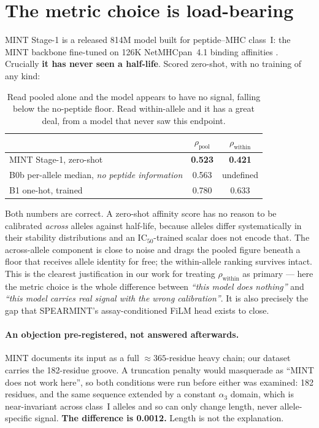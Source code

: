 \documentclass[11pt,a4paper]{article}
\newcommand{\rhop}{\rho_{\text{pool}}}
\newcommand{\rhow}{\rho_{\text{within}}}
\begin{document}
\section{The metric choice is load-bearing}
\label{sec:metric}

MINT Stage-1 \citep{ullanat2026mint, karthikeyan2026spearmint} is a released 814M model built for
peptide--MHC class~I: the MINT backbone fine-tuned on 126K NetMHCpan~4.1 binding affinities
\citep{reynisson2020netmhcpan}. Crucially \textbf{it has never seen a half-life}. Scored zero-shot,
with no training of any kind:

\begin{table}[H]
\centering\small
\begin{tabular}{@{}lcc@{}}
\toprule
 & $\rhop$ & $\rhow$ \\
\midrule
MINT Stage-1, zero-shot & \textbf{0.523} & \textbf{0.421} \\
B0b per-allele median, \emph{no peptide information} & 0.563 & undefined \\
B1 one-hot, trained & 0.780 & 0.633 \\
\bottomrule
\end{tabular}
\caption{Read pooled alone and the model appears to have no signal, falling below the no-peptide
floor. Read within-allele and it has a great deal, from a model that never saw this endpoint.}
\end{table}

Both numbers are correct. A zero-shot affinity score has no reason to be calibrated \emph{across}
alleles against half-life, because alleles differ systematically in their stability distributions
and an $\text{IC}_{50}$-trained scalar does not encode that. The across-allele component is close
to noise and drags the pooled figure beneath a floor that receives allele identity for free; the
within-allele ranking survives intact. This is the clearest justification in our work for treating
$\rhow$ as primary --- here the metric choice is the whole difference between \emph{``this model
does nothing''} and \emph{``this model carries real signal with the wrong calibration''}. It is
also precisely the gap that SPEARMINT's assay-conditioned FiLM head \citep{perez2018film} exists to
close.

\paragraph{An objection pre-registered, not answered afterwards.} MINT documents its input as a
full $\approx365$-residue heavy chain; our dataset carries the 182-residue groove. A truncation
penalty would masquerade as ``MINT does not work here'', so both conditions were run before either
was examined: 182 residues, and the same sequence extended by a constant $\alpha_3$ domain, which
is near-invariant across class~I alleles and so can only change length, never allele-specific
signal. \textbf{The difference is 0.0012.} Length is not the explanation.
\end{document}
